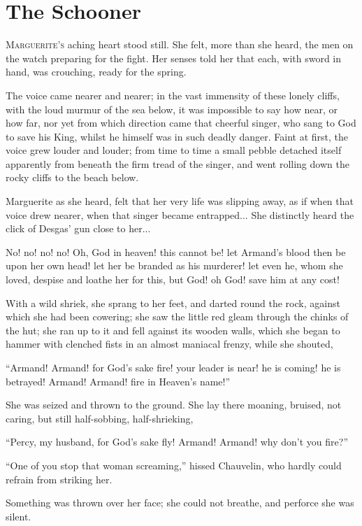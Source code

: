 
\chapter{The Schooner}
\lettrine[lines=4]{M}{arguerite's} aching heart stood still. She felt, more than she heard, the men on the watch preparing for the fight. Her senses told her that each, with sword in hand, was crouching, ready for the spring.

The voice came nearer and nearer; in the vast immensity of these lonely cliffs, with the loud murmur of the sea below, it was impossible to say how near, or how far, nor yet from which direction came that cheerful singer, who sang to God to save his King, whilst he himself was in such deadly danger. Faint at first, the voice grew louder and louder; from time to time a small pebble detached itself apparently from beneath the firm tread of the singer, and went rolling down the rocky cliffs to the beach below.

Marguerite as she heard, felt that her very life was slipping away, as if when that voice drew nearer, when that singer became entrapped... She distinctly heard the click of Desgas’ gun close to her...

No! no! no! no! Oh, God in heaven! this cannot be! let Armand's blood then be upon her own head! let her be branded as his murderer! let even he, whom she loved, despise and loathe her for this, but God! oh God! save him at any cost!

With a wild shriek, she sprang to her feet, and darted round the rock, against which she had been cowering; she saw the little red gleam through the chinks of the hut; she ran up to it and fell against its wooden walls, which she began to hammer with clenched fists in an almost maniacal frenzy, while she shouted,\longdash


\enquote{Armand! Armand! for God's sake fire! your leader is near! he is coming! he is betrayed! Armand! Armand! fire in Heaven's name!}

She was seized and thrown to the ground. She lay there moaning, bruised, not caring, but still half-sobbing, half-shrieking,\longdash


\enquote{Percy, my husband, for God's sake fly! Armand! Armand! why don't you fire?}

\enquote{One of you stop that woman screaming,} hissed Chauvelin, who hardly could refrain from striking her.

Something was thrown over her face; she could not breathe, and perforce she was silent.

